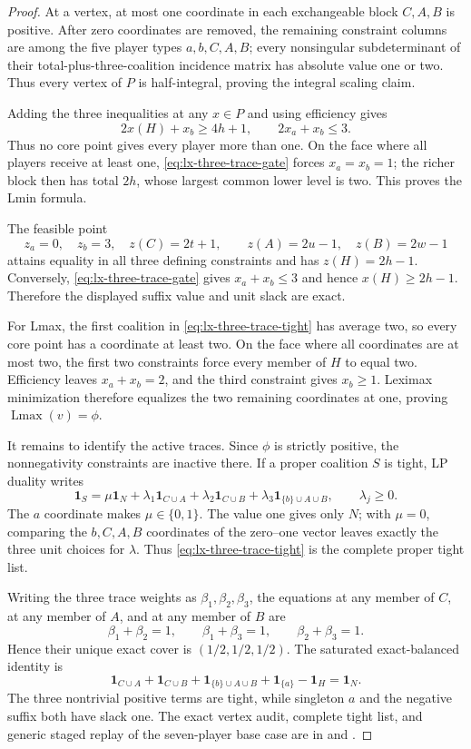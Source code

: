 \begin{proof}
At a vertex, at most one coordinate in each exchangeable block $C,A,B$ is
positive.  After zero coordinates are removed, the remaining constraint
columns are among the five player types $a,b,C,A,B$; every
nonsingular subdeterminant of their total-plus-three-coalition incidence
matrix has absolute value one or two.  Thus every vertex of $P$ is
half-integral, proving the integral scaling claim.

Adding the three inequalities at any $x\in P$ and using efficiency gives
\[
 2x(H)+x_b\geq4h+1,
 \qquad 2x_a+x_b\leq3.                              \tag{HG}
\label{eq:lx-three-trace-gate}
\]
Thus no core point gives every player more than one.  On the face where all
players receive at least one, \eqref{eq:lx-three-trace-gate} forces
$x_a=x_b=1$; the richer block then has total $2h$, whose largest common
lower level is two.  This proves the Lmin formula.

The feasible point
\[
 z_a=0,\quad z_b=3,\quad z(C)=2t+1,
 \qquad z(A)=2u-1,\quad z(B)=2w-1
\]
attains equality in all three defining constraints and has $z(H)=2h-1$.
Conversely, \eqref{eq:lx-three-trace-gate} gives $x_a+x_b\leq3$ and hence
$x(H)\geq2h-1$.  Therefore the displayed suffix value and unit slack are
exact.

For Lmax, the first coalition in \eqref{eq:lx-three-trace-tight} has average
two, so every core point has a coordinate at least two.  On the face where
all coordinates are at most two, the first two constraints force every
member of $H$ to equal two.  Efficiency leaves $x_a+x_b=2$, and the third
constraint gives $x_b\geq1$.  Leximax minimization therefore equalizes the
two remaining coordinates at one, proving $\operatorname{Lmax}(v)=\phi$.

It remains to identify the active traces.  Since $\phi$ is strictly positive,
the nonnegativity constraints are inactive there.  If a proper coalition
$S$ is tight, LP duality writes
\[
 \mathbf1_S=\mu\mathbf1_N
 +\lambda_1\mathbf1_{C\cup A}
 +\lambda_2\mathbf1_{C\cup B}
 +\lambda_3\mathbf1_{\{b\}\cup A\cup B},
 \qquad \lambda_j\geq0.
\]
The $a$ coordinate makes $\mu\in\{0,1\}$.  The value one gives only $N$;
with $\mu=0$, comparing the $b,C,A,B$ coordinates of the zero--one vector
leaves exactly the three unit choices for $\lambda$.  Thus
\eqref{eq:lx-three-trace-tight} is the complete proper tight list.

Writing the three trace weights as $\beta_1,\beta_2,\beta_3$, the equations at
any member of $C$, at any member of $A$, and at any member of $B$ are
\[
 \beta_1+\beta_2=1,
 \qquad\beta_1+\beta_3=1,
 \qquad\beta_2+\beta_3=1.
\]
Hence their unique exact cover is $(1/2,1/2,1/2)$.  The saturated
exact-balanced identity is
\[
 \mathbf1_{C\cup A}+\mathbf1_{C\cup B}
 +\mathbf1_{\{b\}\cup A\cup B}+\mathbf1_{\{a\}}
 -\mathbf1_H=\mathbf1_N.                             \tag{HC}
\label{eq:lx-three-trace-circuit}
\]
The three nontrivial positive terms are tight, while singleton $a$ and the
negative suffix both have slack one.  The exact vertex audit, complete tight
list, and generic staged replay of the seven-player base case are in
 and
.
\end{proof}

